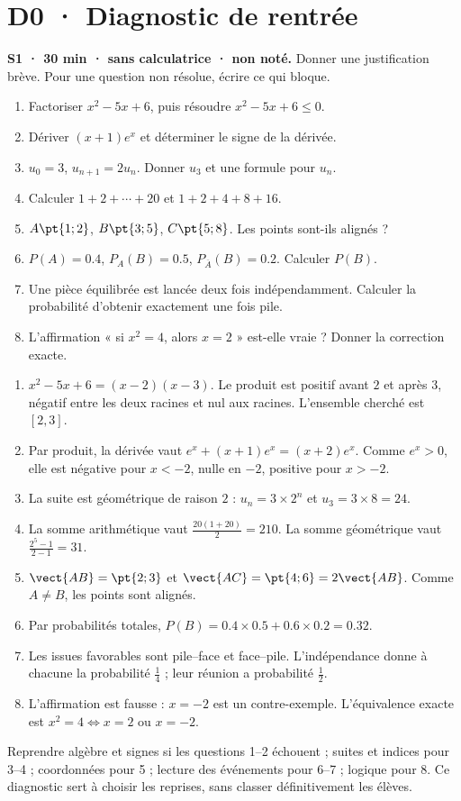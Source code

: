 \mxnewpage\chapter*{D0 · Diagnostic de rentrée}
\textbf{S1 · 30 min · sans calculatrice · non noté.} Donner une justification brève. Pour une question non résolue, écrire ce qui bloque.
\begin{enumerate}
\item Factoriser $x^2-5x+6$, puis résoudre $x^2-5x+6\le0$.
\item Dériver $(x+1)e^x$ et déterminer le signe de la dérivée.
\item $u_0=3$, $u_{n+1}=2u_n$. Donner $u_3$ et une formule pour $u_n$.
\item Calculer $1+2+\cdots+20$ et $1+2+4+8+16$.
\item $A\pt{1;2}$, $B\pt{3;5}$, $C\pt{5;8}$. Les points sont-ils alignés ?
\item $P(A)=\num{0,4}$, $P_A(B)=\num{0,5}$, $P_{\overline A}(B)=\num{0,2}$. Calculer $P(B)$.
\item Une pièce équilibrée est lancée deux fois indépendamment. Calculer la probabilité d'obtenir exactement une fois pile.
\item L'affirmation « si $x^2=4$, alors $x=2$ » est-elle vraie ? Donner la correction exacte.
\end{enumerate}
\ifmxteacher\begin{teachernote}
\begin{enumerate}
\item $x^2-5x+6=(x-2)(x-3)$. Le produit est positif avant $2$ et après $3$, négatif entre les deux racines et nul aux racines. L'ensemble cherché est $[2,3]$.
\item Par produit, la dérivée vaut $e^x+(x+1)e^x=(x+2)e^x$. Comme $e^x>0$, elle est négative pour $x<-2$, nulle en $-2$, positive pour $x>-2$.
\item La suite est géométrique de raison $2$ : $u_n=3\times2^n$ et $u_3=3\times8=24$.
\item La somme arithmétique vaut $\frac{20(1+20)}{2}=210$. La somme géométrique vaut $\frac{2^5-1}{2-1}=31$.
\item $\vect{AB}=\pt{2;3}$ et $\vect{AC}=\pt{4;6}=2\vect{AB}$. Comme $A\ne B$, les points sont alignés.
\item Par probabilités totales, $P(B)=\num{0,4}\times\num{0,5}+\num{0,6}\times\num{0,2}=\num{0,32}$.
\item Les issues favorables sont pile--face et face--pile. L'indépendance donne à chacune la probabilité $\frac{1}{4}$ ; leur réunion a probabilité $\frac{1}{2}$.
\item L'affirmation est fausse : $x=-2$ est un contre-exemple. L'équivalence exacte est $x^2=4\Longleftrightarrow x=2\text{ ou }x=-2$.
\end{enumerate}
Reprendre algèbre et signes si les questions 1--2 échouent ; suites et indices pour 3--4 ; coordonnées pour 5 ; lecture des événements pour 6--7 ; logique pour 8. Ce diagnostic sert à choisir les reprises, sans classer définitivement les élèves.
\end{teachernote}\fi
\mainmatter


